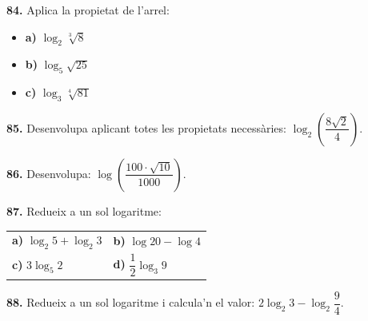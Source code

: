 \documentclass[13pt,a4paper]{extarticle}
\begin{document}
\par\noindent\begin{minipage}{\linewidth}
\textbf{84.} Aplica la propietat de l'arrel:\par

\begin{itemize}[leftmargin=0pt,itemsep=3pt,topsep=3pt,parsep=0pt,label={}]
\item \textbf{a)} $\log_2 \sqrt[3]{8}$
\item \textbf{b)} $\log_5\sqrt{25}$
\item \textbf{c)} $\log_3\sqrt[4]{81}$
\end{itemize}
\end{minipage}\par\vspace{1.6mm}
\par\noindent\begin{minipage}{\linewidth}
\textbf{85.} Desenvolupa aplicant totes les propietats necessàries: $\log_2\left(\dfrac{8\sqrt2}{4}\right)$.\par
\end{minipage}\par\vspace{1.6mm}
\par\noindent\begin{minipage}{\linewidth}
\textbf{86.} Desenvolupa: $\log\left(\dfrac{100\cdot\sqrt{10}}{1000}\right)$.\par
\end{minipage}\par\vspace{1.6mm}
\par\noindent\begin{minipage}{\linewidth}
\textbf{87.} Redueix a un sol logaritme:\par

\begin{tabular}{@{}p{.46\linewidth}p{.46\linewidth}@{}}
\textbf{a)} $\log_2 5+\log_2 3$ & \textbf{b)} $\log 20-\log 4$ \\[2pt]
\textbf{c)} $3\log_5 2$ & \textbf{d)} $\dfrac12 \log_3 9$ \\[2pt]
\end{tabular}\par
\end{minipage}\par\vspace{1.6mm}
\par\noindent\begin{minipage}{\linewidth}
\textbf{88.} Redueix a un sol logaritme i calcula'n el valor: $2\log_2 3-\log_2 \dfrac{9}{4}$.\par
\end{minipage}\par\vspace{1.6mm}
\end{document}
